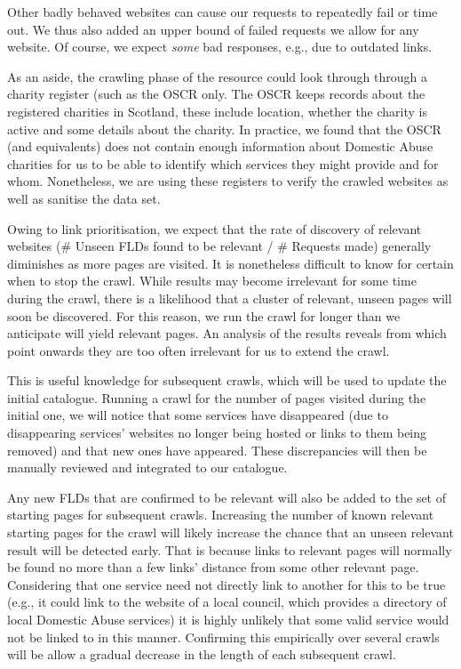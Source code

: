 \documentclass[conference]{IEEEtran}
\begin{document}
Other badly behaved websites can cause our requests to repeatedly fail or time out. 
We thus also added an upper bound of failed requests we allow for any website. 
Of course, we expect \textit{some} bad responses, e.g., due to outdated links.

As an aside, the crawling phase of the resource could look through through a charity register (such as the OSCR \cite{scotchar} only. 
The OSCR keeps records about the registered charities in Scotland, these include location, whether the charity is active and some details about the charity. 
In practice, we found that the OSCR (and equivalents) does not contain enough information about Domestic Abuse charities for us to be able to identify which services they might provide and for whom.
Nonetheless, we are using these registers to verify the crawled websites as well as sanitise the data set.

Owing to link prioritisation, we expect that the rate of discovery of relevant websites (\# Unseen FLDs found to be relevant / \# Requests made) generally diminishes as more pages are visited. 
It is nonetheless difficult to know for certain when to stop the crawl. 
While results may become irrelevant for some time during the crawl, there is a likelihood that a cluster of relevant, unseen pages will soon be discovered. 
For this reason, we run the crawl for longer than we anticipate will yield relevant pages. 
An analysis of the results reveals from which point onwards they are too often irrelevant for us to extend the crawl.

This is useful knowledge for subsequent crawls, which will be used to update the initial catalogue. Running a crawl for the number of pages visited during the initial one, we will notice that some services have disappeared (due to disappearing services' websites no longer being hosted or links to them being removed) and that new ones have appeared. These discrepancies will then be manually reviewed and integrated to our catalogue.

Any new FLDs that are confirmed to be relevant will also be added to the set of starting pages for subsequent crawls. Increasing the number of known relevant starting pages for the crawl will likely increase the chance that an unseen relevant result will be detected early. That is because links to relevant pages will normally be found no more than a few links' distance from some other relevant page. Considering that one service need not directly link to another for this to be true (e.g., it could link to the website of a local council, which provides a directory of local Domestic Abuse services) it is highly unlikely that some valid service would not be linked to in this manner. Confirming this empirically over several crawls will be allow a gradual decrease in the length of each subsequent crawl.
\end{document}
